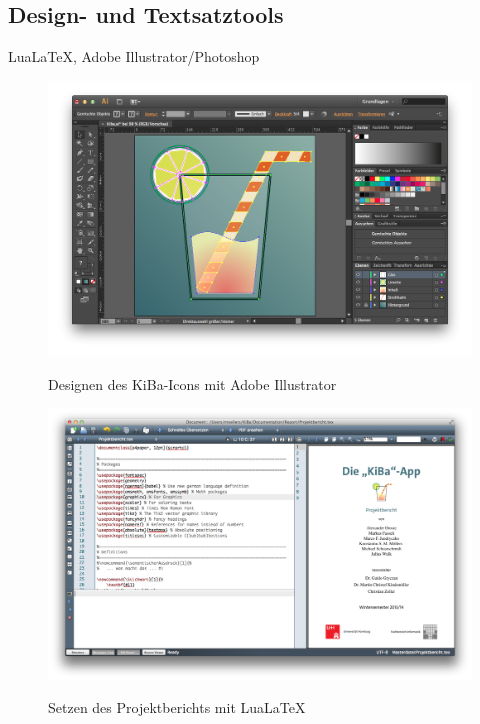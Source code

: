\subsection{Design- und Textsatztools}
Lua\LaTeX{}, Adobe Illustrator/Photoshop
\begin{figure}
	\centering
	\includegraphics[scale=.3]{Pictures/IllustratorIcon}
	\label{fig:IllustratorIcon}
	\caption{Designen des KiBa-Icons mit Adobe Illustrator}
\end{figure}
\begin{figure}
	\centering
	\includegraphics[scale=.3]{Pictures/LaTeXBericht}
	\label{fig:LaTeXBericht}
	\caption{Setzen des Projektberichts mit Lua\LaTeX}
\end{figure}
